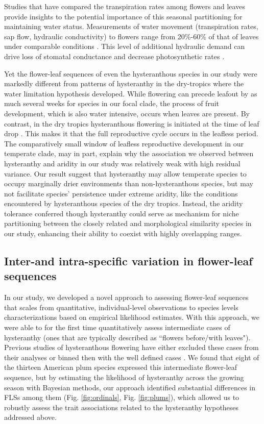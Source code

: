 \documentclass{article}[11pt]
\begin{document}
{Studies that have compared the transpiration rates among flowers and leaves provide insights to the potential importance of this seasonal partitioning for maintaining water status. Measurements of water movement (transpiration rates, sap flow, hydraulic conductivity) to flowers range from 20\%-60\% of that of leaves under comparable conditions \citep{Whiley:1988uf,Roddy:2012wn,Liu:2017wg,McMann:2022ww}. This level of additional hydraulic demand can drive loss of stomatal conductance and decrease photosynthetic rates \citep{Galen:1999vr}.
 
Yet the flower-leaf sequences of even the hysteranthous species in our study were markedly different from patterns of hysteranthy in the dry-tropics where the water limitation hypothesis developed. While flowering can precede leafout by as much several weeks for species in our focal clade, the process of fruit development, which is also water intensive, occurs when leaves are present. By contrast, in the dry tropics hysteranthous flowering is initiated at the time of leaf drop \citep{Borchert1983,Franklin2016}. This makes it that the full reproductive cycle occurs in the leafless period. The comparatively small window of leafless reproductive development in our temperate clade, may in part, explain why the association we observed between hysteranthy and aridity in our study was relatively weak with high residual variance. Our result suggest that hysteranthy may allow temperate species to occupy marginally drier environments than non-hysteranthous species, but may not facilitate species' persistence under extreme aridity, like the conditions encountered by hysteranthous species of the dry tropics. Instead, the aridity tolerance conferred though hysteranthy could serve as mechanism for niche partitioning between the closely related and morphological similarity species in our study, enhancing their ability to coexist with highly overlapping ranges.

\subsection*{Inter-and intra-specific variation in flower-leaf sequences}
In our study, we developed a novel approach to assessing flower-leaf sequences that scales from quantitative, individual-level observations to species levels characterizations based on empirical likelihood estimates. With this approach, we were able to for the first time quantitatively assess intermediate cases of hysteranthy (ones that are typically described as ``flowers before/with leaves"). Previous studies of hysteranthous flowering have either excluded these cases from their analyses  \citep[e.g.;][]{Gougherty2018} or binned then with the well defined cases \citep[e.g.;][]{Buonaiuto2020}. We found that eight of the thirteen American plum species expressed this intermediate flower-leaf sequence, but by estimating the likelihood of hysteranthy across the growing season with Bayesian methods, our approach identified substantial differences in FLSs among them (Fig. \ref{fig:ordinals}, Fig. \ref{fig:plums}), which allowed us to robustly assess the trait associations related to the hysteranthy hypotheses addressed above.

}
\end{document}
